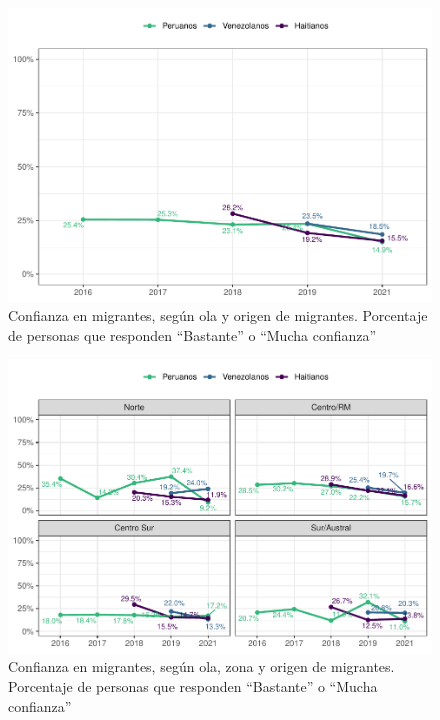 \documentclass[
  12pt,
]{book}
\begin{document}
\begin{figure}

{\centering \includegraphics{reporte-elsoc_files/figure-latex/conf-wave-1} 

}

\caption{Confianza en migrantes, según ola y origen de migrantes. Porcentaje de personas que responden “Bastante” o “Mucha confianza”}\label{fig:conf-wave}
\end{figure}

\begin{figure}

{\centering \includegraphics{reporte-elsoc_files/figure-latex/conf-zona-1} 

}

\caption{Confianza en migrantes, según ola, zona y origen de migrantes. Porcentaje de personas que responden “Bastante” o “Mucha confianza”}\label{fig:conf-zona}
\end{figure}
\end{document}
